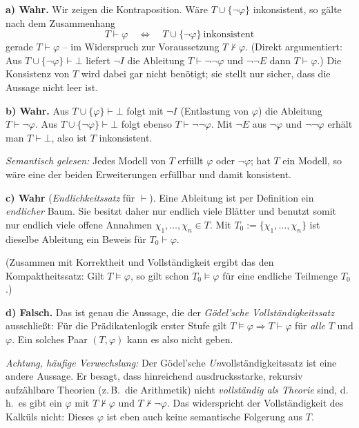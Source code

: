 \begin{loesung}
\textbf{a) Wahr.} Wir zeigen die Kontraposition. Wäre $T\cup\{\neg\varphi\}$ inkonsistent, so gälte nach dem Zusammenhang
\[
  T\vdash\varphi \quad\Longleftrightarrow\quad T\cup\{\neg\varphi\}\ \text{inkonsistent}
\]
gerade $T\vdash\varphi$ -- im Widerspruch zur Voraussetzung $T\nvdash\varphi$. (Direkt argumentiert: Aus $T\cup\{\neg\varphi\}\vdash\bot$ liefert $\neg I$ die Ableitung $T\vdash\neg\neg\varphi$ und $\neg\neg E$ dann $T\vdash\varphi$.) Die Konsistenz von $T$ wird dabei gar nicht benötigt; sie stellt nur sicher, dass die Aussage nicht leer ist.

\textbf{b) Wahr.} Aus $T\cup\{\varphi\}\vdash\bot$ folgt mit $\neg I$ (Entlastung von $\varphi$) die Ableitung $T\vdash\neg\varphi$. Aus $T\cup\{\neg\varphi\}\vdash\bot$ folgt ebenso $T\vdash\neg\neg\varphi$. Mit $\neg E$ aus $\neg\varphi$ und $\neg\neg\varphi$ erhält man $T\vdash\bot$, also ist $T$ inkonsistent.

\textit{Semantisch gelesen:} Jedes Modell von $T$ erfüllt $\varphi$ oder $\neg\varphi$; hat $T$ ein Modell, so wäre eine der beiden Erweiterungen erfüllbar und damit konsistent.

\textbf{c) Wahr} (\emph{Endlichkeitssatz} für $\vdash$). Eine Ableitung ist per Definition ein \emph{endlicher} Baum. Sie besitzt daher nur endlich viele Blätter und benutzt somit nur endlich viele offene Annahmen $\chi_1,\dots,\chi_n\in T$. Mit $T_0:=\{\chi_1,\dots,\chi_n\}$ ist dieselbe Ableitung ein Beweis für $T_0\vdash\varphi$.

(Zusammen mit Korrektheit und Vollständigkeit ergibt das den Kompaktheitssatz: Gilt $T\models\varphi$, so gilt schon $T_0\models\varphi$ für eine endliche Teilmenge $T_0$.)

\textbf{d) Falsch.} Das ist genau die Aussage, die der \emph{Gödel'sche Vollständigkeitssatz} ausschließt: Für die Prädikatenlogik erster Stufe gilt $T\models\varphi \Rightarrow T\vdash\varphi$ für \emph{alle} $T$ und $\varphi$. Ein solches Paar $(T,\varphi)$ kann es also nicht geben.

\textit{Achtung, häufige Verwechslung:} Der Gödel'sche \emph{Un}vollständigkeitssatz ist eine andere Aussage. Er besagt, dass hinreichend ausdrucksstarke, rekursiv aufzählbare Theorien (z.\,B.\ die Arithmetik) nicht \emph{vollständig als Theorie} sind, d.\,h.\ es gibt ein $\varphi$ mit $T\nvdash\varphi$ und $T\nvdash\neg\varphi$. Das widerspricht der Vollständigkeit des Kalküls nicht: Dieses $\varphi$ ist eben auch keine semantische Folgerung aus $T$.


\end{loesung}
